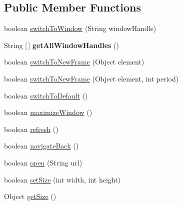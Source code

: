\subsection*{Public Member Functions}
\begin{DoxyCompactItemize}
\item 
boolean \hyperlink{interfacecom_1_1zeuslearning_1_1automation_1_1interactions_1_1IWindowOperations_ab79086f48e864eb7a2dcf3b53d94dc2b}{switch\+To\+Window} (String window\+Handle)
\item 
\hypertarget{interfacecom_1_1zeuslearning_1_1automation_1_1interactions_1_1IWindowOperations_a62fb295bc8afb1a603ed581c245273a7}{}\label{interfacecom_1_1zeuslearning_1_1automation_1_1interactions_1_1IWindowOperations_a62fb295bc8afb1a603ed581c245273a7} 
String \mbox{[}$\,$\mbox{]} {\bfseries get\+All\+Window\+Handles} ()
\item 
boolean \hyperlink{interfacecom_1_1zeuslearning_1_1automation_1_1interactions_1_1IWindowOperations_a9d922d36597fad9aa9e9eb79fb334efe}{switch\+To\+New\+Frame} (Object element)
\item 
boolean \hyperlink{interfacecom_1_1zeuslearning_1_1automation_1_1interactions_1_1IWindowOperations_a24e2a4aa538e35924e7195d058f30b9b}{switch\+To\+New\+Frame} (Object element, int period)
\item 
boolean \hyperlink{interfacecom_1_1zeuslearning_1_1automation_1_1interactions_1_1IWindowOperations_a6f6837d3d153ce5f6504689d2ec88613}{switch\+To\+Default} ()
\item 
boolean \hyperlink{interfacecom_1_1zeuslearning_1_1automation_1_1interactions_1_1IWindowOperations_aafa2eefdac53d368d85e626d7d7901ea}{maximize\+Window} ()
\item 
boolean \hyperlink{interfacecom_1_1zeuslearning_1_1automation_1_1interactions_1_1IWindowOperations_afdd3ee64ae88246ef6f4006dcf6b094e}{refresh} ()
\item 
boolean \hyperlink{interfacecom_1_1zeuslearning_1_1automation_1_1interactions_1_1IWindowOperations_a609624cbf549bfa10a2fd9265f33ea61}{navigate\+Back} ()
\item 
boolean \hyperlink{interfacecom_1_1zeuslearning_1_1automation_1_1interactions_1_1IWindowOperations_a51671fb00e9eaafb2e49978a8bf3305d}{open} (String url)
\item 
boolean \hyperlink{interfacecom_1_1zeuslearning_1_1automation_1_1interactions_1_1IWindowOperations_ad3cb79f49fa700778fe85eb272c8385f}{set\+Size} (int width, int height)
\item 
Object \hyperlink{interfacecom_1_1zeuslearning_1_1automation_1_1interactions_1_1IWindowOperations_a686ed29895edf5c89045fff9329b83f4}{get\+Size} ()

\end{DoxyCompactItemize}
